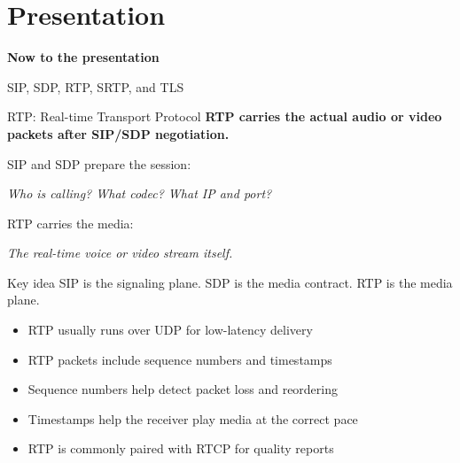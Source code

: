 \documentclass[aspectratio=169]{beamer}
\begin{document}
\section{Presentation}

\begin{frame}
    \centering
    \vfill

    {\Huge \textbf{Now to the presentation}}

    \vspace{0.4cm}

    {\Large SIP, SDP, RTP, SRTP, and TLS}

    \vfill
\end{frame}



\begin{frame}{RTP: Real-time Transport Protocol}
\textbf{RTP carries the actual audio or video packets after SIP/SDP negotiation.}

\vspace{0.35cm}

SIP and SDP prepare the session:

\begin{center}
\textit{Who is calling? What codec? What IP and port?}
\end{center}

RTP carries the media:

\begin{center}
\textit{The real-time voice or video stream itself.}
\end{center}

\vspace{0.25cm}

\begin{block}{Key idea}
SIP is the signaling plane. SDP is the media contract. RTP is the media plane.
\end{block}

\vspace{0.25cm}

\begin{itemize}
    \item RTP usually runs over UDP for low-latency delivery
    \item RTP packets include sequence numbers and timestamps
    \item Sequence numbers help detect packet loss and reordering
    \item Timestamps help the receiver play media at the correct pace
    \item RTP is commonly paired with RTCP for quality reports
\end{itemize}

\end{frame}
\end{document}
